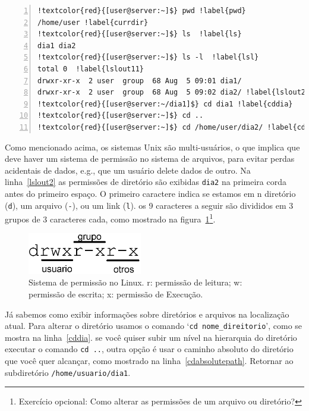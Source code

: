 \documentclass[letter,11pt]{book}
\begin{document}
\begin{Verbatim}[commandchars=!\{\},numbers=left,firstnumber=last,label=Navegando pela árvore de diretórios,frame=topline,fontsize=\scriptsize]
!textcolor{red}{[user@server:~]$} pwd !label{pwd}
/home/user !label{currdir}
!textcolor{red}{[user@server:~]$} ls  !label{ls}
dia1 dia2
!textcolor{red}{[user@server:~]$} ls -l  !label{lsl}
total 0  !label{lslout11}
drwxr-xr-x  2 user  group  68 Aug  5 09:01 dia1/
drwxr-xr-x  2 user  group  68 Aug  5 09:02 dia2/ !label{lslout22}
!textcolor{red}{[user@server:~/dia1]$} cd dia1 !label{cddia}
!textcolor{red}{[user@server:~]$} cd ..
!textcolor{red}{[user@server:~]$} cd /home/user/dia2/ !label{cdabsolutepath}
\end{Verbatim} 

Como mencionado acima, os sistemas Unix são multi-usuários, o que implica que deve haver um sistema de permissão no sistema de arquivos, para evitar perdas acidentais de dados, e.g., que um usuário delete dados de outro. Na linha~\ref{lslout2} as permissões de diretório são exibidas \Verb+dia2+ na primeira corda antes do primeiro espaço. O primeiro caractere indica se estamos em n diretório (\Verb+d+), um arquivo (\Verb+-+), ou um link (\Verb+l+). os 9 caracteres a seguir são divididos em 3 grupos de 3 caracteres cada, como mostrado na figura~\ref{permisos}\footnote{Exercício opcional: {\textquestiondown}Como alterar as permissões de um arquivo ou diretório?}.

\begin{figure}[ht]
\centering
   \includegraphics[width=5cm]{Figs/permisos.png}
  \caption[Sistema de permissão no Linux]{\label{permisos}Sistema de permissão no Linux. r: permissão de leitura; w: permissão de escrita; x: permissão de Execução.}
\end{figure}

Já sabemos como exibir informações sobre diretórios e arquivos na localização atual. Para alterar o diretório usamos o comando `\Verb+cd nome_direitorio+', como se mostra na linha~\ref{cddia}. se você quiser subir um nível na hierarquia do diretório executar o comando \Verb+cd ..+, outra opção é usar o caminho absoluto do diretório que você quer alcançar, como mostrado na linha~\ref{cdabsolutepath}. Retornar ao subdiretório \Verb+/home/usuario/dia1+.
\end{document}
